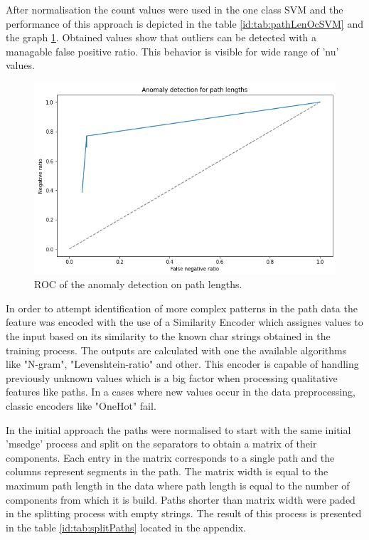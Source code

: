 \documentclass[a4paper,twoside,12pt]{book}
\begin{document}
After normalisation the count values were used in the one class SVM and the performance
of this approach is depicted in the table \ref{id:tab:pathLenOcSVM} and the graph \ref{fig:pathLenROC}. 
Obtained values show that outliers can be detected with a managable false positive ratio. This 
behavior is visible for wide range of 'nu' values. 

\begin{figure}
	\centering
	\includegraphics[scale=0.9]{images/PathLenROC}
	\caption{ROC of the anomaly detection on path lengths.}
	\label{fig:pathLenROC}
 \end{figure}



In order to attempt identification of more complex patterns in the path data the feature was encoded with
the use of a Similarity Encoder which assignes values to the input based on its similarity 
to the known char strings obtained in the training process. The outputs are calculated with 
one the available algorithms like "N-gram", "Levenshtein-ratio" and other. This encoder is
capable of handling previously unknown values which is a big factor when processing 
qualitative features like paths. In a cases where new values occur in the data preprocessing,
classic encoders like "OneHot" fail. 

In the initial approach the paths were normalised to start with the same initial 'msedge' 
process and split on the separators to obtain a matrix of their components. Each entry in the
matrix corresponds to a single path and the columns represent segments in the path. The matrix
width is equal to the maximum path length in the data where path length is equal to the number
of components from which it is build. Paths shorter than matrix width were paded in the splitting
process with empty strings. The result of this process is presented in the table \ref{id:tab:splitPaths} 
located in the appendix. 
\end{document}
